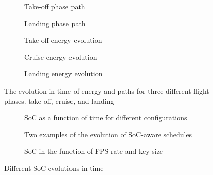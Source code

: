   
  \begin{figure}[p]
    \centering
    \selectfont
    \footnotesize
    \begin{subfigure}[c]{0.475\textwidth}
      \centering
      
      \caption{Take-off phase path}
      \label{fig:takeoff-path}
      \vspace{3ex}
    \end{subfigure}
    \begin{subfigure}[c]{0.475\textwidth}
      \centering
      
      \vspace*{3ex}
      \caption{Landing phase path}
      \label{fig:landing-path}
      \vspace{3ex}
    \end{subfigure}
    \quad
    \begin{subfigure}[t]{0.34\textwidth}
      \centering
      
      \caption{Take-off energy evolution}
      \label{fig:takeoff-energy}
    \end{subfigure}
    \begin{subfigure}[t]{0.32\textwidth}
      \centering
      
      \caption{Cruise energy evolution}
      \label{fig:cruise-energy}
    \end{subfigure}
    \begin{subfigure}[t]{0.30\textwidth}
      \centering
      
      \caption{Landing energy evolution}
      \label{fig:landing-energy}
    \end{subfigure}
    \caption{The evolution in time of energy and paths for three different flight phases. take-off, cruise, and landing}
    \label{fig:path-energy}
  \end{figure}

  \begin{figure}[p]
    \centering
    \selectfont
    \footnotesize
    \begin{subfigure}[t]{0.31\textwidth}
      \centering
      
      \vspace*{-2.5ex}
      \caption{SoC as a function of time for different configurations}
      \label{fig:soc-configuration}
    \end{subfigure}
    \begin{subfigure}[t]{0.29\textwidth}
      \centering
      
      \caption{Two examples of the evolution of SoC-aware schedules}
      \label{fig:soc-schedule}
    \end{subfigure}
    \begin{subfigure}[t]{0.36\textwidth}
      \centering
      
      \vspace*{-2.6ex}
      \caption{SoC in the function of FPS rate and key-size}
      \label{fig:soc-plot}
    \end{subfigure}
    \caption{Different SoC evolutions in time}
    \label{fig:soc-evolution1}
  \end{figure}

